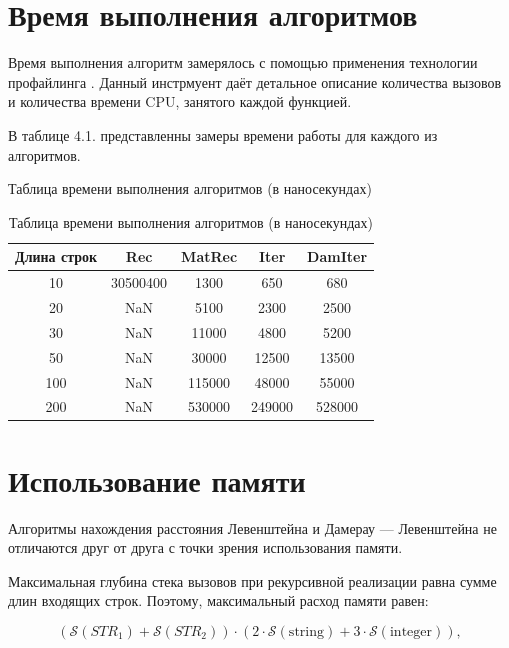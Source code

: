 \documentclass[12pt]{report}
\begin{document}
\section{Время выполнения алгоритмов}
Время выполнения алгоритм замерялось с помощью применения технологии профайлинга \cite{profiling}. Данный инстрмуент даёт детальное описание количества вызовов и количества времени CPU, занятого каждой функцией. \newline

В таблице 4.1. представленны замеры времени работы для каждого из алгоритмов.

\begin{table} [h!]
	\caption{Таблица времени выполнения алгоритмов (в наносекундах)}
	\begin{center}
	    \caption{Таблица времени выполнения алгоритмов (в наносекундах)}
		\begin{tabular}{|c c c c c|} 
		 	\hline
			Длина строк & Rec & MatRec & Iter & DamIter \\  
		 	\hline
		 	10 & 30500400 & 1300 & 650 & 680\\
		 	\hline
		 	20 & NaN & 5100 & 2300 & 2500 \\
		 	\hline
			30 & NaN & 11000 & 4800 & 5200 \\
			\hline
			50 & NaN & 30000 & 12500 & 13500 \\
			\hline
			100 & NaN & 115000 & 48000 & 55000\\
			\hline
			200 & NaN & 530000 & 249000 & 528000 \\
			\hline
		\end{tabular}
	\end{center}
\end{table}

\section{Использование памяти}

Алгоритмы нахождения расстояния Левенштейна и Дамерау — Левенштейна не отличаются друг от друга с точки зрения использования памяти.

Максимальная глубина стека вызовов при рекурсивной реализации равна сумме длин входящих строк. Поэтому, максимальный расход памяти равен: 

\begin{equation}
(\mathcal{S}(STR_1) + \mathcal{S}(STR_2)) \cdot (2 \cdot \mathcal{S}\mathrm{(string)} + 3 \cdot \mathcal{S}\mathrm{(integer)}),
\end{equation}
\end{document}
